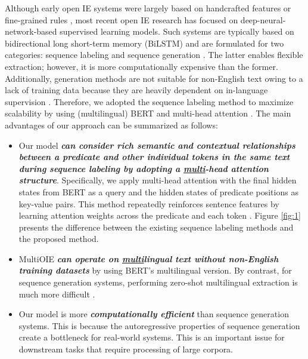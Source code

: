 \documentclass[11pt,a4paper]{article}
\begin{document}
Although early open IE systems were largely based on handcrafted features or fine-grained rules \citep{fader-etal-2011-identifying,mausam-etal-2012-open,10.1145/2488388.2488420}, most recent open IE research has focused on deep-neural-network-based supervised learning models.
Such systems are typically based on bidirectional long short-term memory (BiLSTM) and are formulated for two categories: sequence labeling \citep{stanovsky-etal-2018-supervised,Sarhan2019ContextualizedWE,jia2019hybrid} and sequence generation \citep{cui-etal-2018-neural,10.1145/3159652.3159712,bhutani-etal-2019-open}.
The latter enables flexible extraction; however, it is more computationally expensive than the former.
Additionally, generation methods are not suitable for non-English text owing to a lack of training data because they are heavily dependent on in-language supervision \citep{ponti-etal-2019-towards}.
Therefore, we adopted the sequence labeling method to maximize scalability by using (multilingual) BERT \citep{devlin-etal-2019-bert} and multi-head attention \citep{10.5555/3295222.3295349}.
The main advantages of our approach can be summarized as follows:
\begin{itemize}[leftmargin=0.4cm]
\setlength{\itemindent}{0em}
\item
Our model \textbf{\textit{can consider rich semantic and contextual relationships between a predicate and other individual tokens in the same text during sequence labeling by adopting a \underline{multi}-head attention structure}}. Specifically, we apply multi-head attention with the final hidden states from BERT as a query and the hidden states of predicate positions as key-value pairs. This method repeatedly reinforces sentence features by learning attention weights across the predicate and each token \citep{tsai-etal-2019-multimodal}.
Figure \ref{fig:1} presents the difference between the existing sequence labeling methods and the proposed method.
\item
MultiOIE \textbf{\textit{can operate on \underline{multi}lingual text without non-English training datasets}} by using BERT's multilingual version.
By contrast, for sequence generation systems, performing zero-shot multilingual extraction is much more difficult \citep{ronnqvist-etal-2019-multilingual}.
\item
Our model is more \textbf{\textit{computationally efficient}} than sequence generation systems.
This is because the autoregressive properties of sequence generation create a bottleneck for real-world systems.
This is an important issue for downstream tasks that require processing of large corpora.
\end{itemize}
\end{document}
